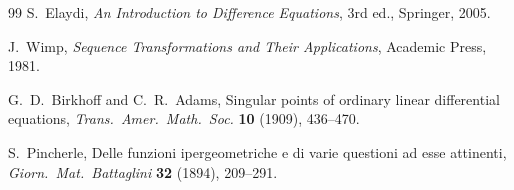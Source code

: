\documentclass[11pt,a4paper]{amsart}
\theoremstyle{plain}
\theoremstyle{definition}
\theoremstyle{remark}
\begin{document}
\begin{thebibliography}{99}
  S.~Elaydi,
  \emph{An Introduction to Difference Equations},
  3rd ed., Springer, 2005.

  J.~Wimp,
  \emph{Sequence Transformations and Their Applications},
  Academic Press, 1981.

  G.~D.~Birkhoff and C.~R.~Adams,
  Singular points of ordinary linear differential equations,
  \emph{Trans.\ Amer.\ Math.\ Soc.} \textbf{10} (1909), 436--470.

  S.~Pincherle,
  Delle funzioni ipergeometriche e di varie questioni ad esse attinenti,
  \emph{Giorn.\ Mat.\ Battaglini} \textbf{32} (1894), 209--291.

\end{thebibliography}
\end{document}
